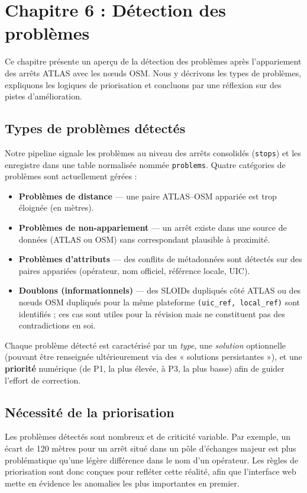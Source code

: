 \chapter{Chapitre 6 : Détection des problèmes}

\noindent Ce chapitre présente un aperçu de la détection des problèmes après l'appariement des arrêts ATLAS avec les nœuds OSM. Nous y décrivons les types de problèmes, expliquons les logiques de priorisation et concluons par une réflexion sur des pistes d'amélioration.

\section{Types de problèmes détectés}
Notre pipeline signale les problèmes au niveau des arrêts consolidés (\texttt{stops}) et les enregistre dans une table normalisée nommée \texttt{problems}. Quatre catégories de problèmes sont actuellement gérées :
\begin{itemize}
  \item \textbf{Problèmes de distance} — une paire ATLAS–OSM appariée est trop éloignée (en mètres).
  \item \textbf{Problèmes de non-appariement} — un arrêt existe dans une source de données (ATLAS ou OSM) sans correspondant plausible à proximité.
  \item \textbf{Problèmes d'attributs} — des conflits de métadonnées sont détectés sur des paires appariées (opérateur, nom officiel, référence locale, UIC).
  \item \textbf{Doublons (informationnels)} — des SLOIDs dupliqués côté ATLAS ou des nœuds OSM dupliqués pour la même plateforme \texttt{(uic\_ref, local\_ref)} sont identifiés ; ces cas sont utiles pour la révision mais ne constituent pas des contradictions en soi.
\end{itemize}

Chaque problème détecté est caractérisé par un \emph{type}, une \emph{solution} optionnelle (pouvant être renseignée ultérieurement via des « solutions persistantes »), et une \textbf{priorité} numérique (de P1, la plus élevée, à P3, la plus basse) afin de guider l'effort de correction.

\section{Nécessité de la priorisation}
Les problèmes détectés sont nombreux et de criticité variable. Par exemple, un écart de 120 mètres pour un arrêt situé dans un pôle d'échanges majeur est plus problématique qu'une légère différence dans le nom d'un opérateur. Les règles de priorisation sont donc conçues pour refléter cette réalité, afin que l'interface web mette en évidence les anomalies les plus importantes en premier.

